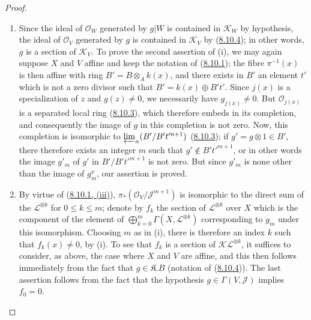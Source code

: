 \begin{proof}
\begin{enumerate}
  \item[\rm{(i)}] Since the ideal of $\mathcal{O}_W$ generated by $g|W$ is
  contained in $\mathcal{K}_W$ by hypothesis, the ideal of $\mathcal{O}_V$
  generated by $g$ is contained in $\mathcal{K}_V$ by
  (\hyperref[II.8.10.4]{8.10.4}); in other words, $g$ is a section of
  $\mathcal{K}_V$. To prove the second assertion of (i), we may again
  suppose $X$ and $V$ affine and keep the notation of
  (\hyperref[II.8.10.1]{8.10.1}); the fibre $\pi^{-1}(x)$ is then affine
  with ring $B'=B\otimes_A k(x)$, and there exists in $B'$ an element $t'$
  which is not a zero divisor such that $B'=k(x)\oplus B't'$. Since $j(x)$ is a
  specialization of $z$ and $g(z)\neq0$, we necessarily have
  $g_{j(x)}\neq0$. But $\mathcal{O}_{j(x)}$ is a separated local ring
  (\hyperref[II.8.10.3]{8.10.3}), which therefore embeds in its completion,
  and consequently the image of $g$ in this completion is not zero. Now, this
  completion is isomorphic to $\varprojlim_n(B'/B't'^{n+1})$
  (\hyperref[II.8.10.3]{8.10.3}); if $g'=g\otimes1\in B'$, there therefore
  exists an integer $m$ such that $g'\notin B't'^{m+1}$, or in other words
  the image $g'_m$ of $g'$ in $B'/B't'^{m+1}$ is not zero. But since $g'_m$ is
  none other than the image of $g_m^x$, our assertion is proved.
  \item[\rm{(ii)}] By virtue of
  (\hyperref[II.8.10.1]{8.10.1, (iii)}),
  $\pi_*(\mathcal{O}_V/\mathcal{J}^{m+1})$ is isomorphic to the direct sum
  of the $\mathcal{L}^{\otimes k}$ for $0\leqslant k\leqslant m$; denote
  by $f_k$ the section of $\mathcal{L}^{\otimes k}$ over $X$ which is the
  component of the element of
  $\bigoplus_{k=0}^m\Gamma(X,\mathcal{L}^{\otimes k})$ corresponding to $g_m$
  under this isomorphism. Choosing $m$ as in (i), there is therefore an index
  $k$ such that $f_k(x)\neq0$, by (i). To see that $f_k$ is a section
  of $\mathcal{K}\mathcal{L}^{\otimes k}$, it suffices to consider, as
  above, the case where $X$ and $V$ are affine, and this then follows
  immediately from the fact that $g\in\mathfrak{K}.B$ (notation of
  (\hyperref[II.8.10.4]{8.10.4})). The last assertion follows from the fact
  that the hypothesis $g\in\Gamma(V,\mathcal{J})$ implies $f_0=0$.
\end{enumerate}
\end{proof}

